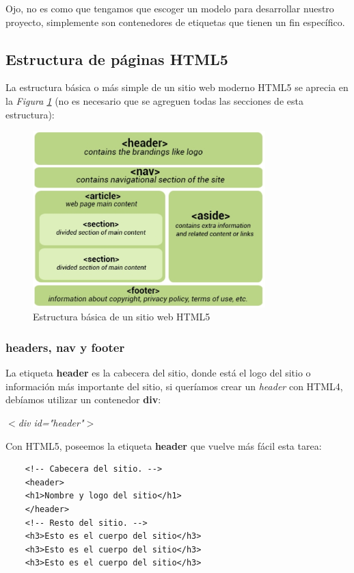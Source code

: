 Ojo, no es como que tengamos que escoger un modelo para desarrollar nuestro proyecto, simplemente son contenedores de etiquetas que tienen un fin específico.


\subsection{Estructura de páginas HTML5}
\hspace{0.55cm}La estructura básica o más simple de un sitio web moderno HTML5 se aprecia en la \textit{Figura \ref{fig: 13}} (no es necesario que se agreguen todas las secciones de esta estructura):
\begin{figure}[H]
    \centering
    \caption{Estructura básica de un sitio web HTML5}
    \label{fig: 13}
    \includegraphics[width=9cm]{ss_html/estructura basica_html5.png}
\end{figure}


\subsubsection{headers, nav y footer}
\hspace{0.55cm}La etiqueta \textbf{header} es la cabecera del sitio, donde está el logo del sitio o información más importante del sitio, si queríamos crear un \textit{header} con HTML4, debíamos utilizar un contenedor \textbf{div}:
\begin{center}
    \textit{$<$div id="header"$>$}
\end{center}

Con HTML5, poseemos la etiqueta \textbf{header} que vuelve más fácil esta tarea:
\begin{lstlisting}
    <!-- Cabecera del sitio. -->
    <header>
	<h1>Nombre y logo del sitio</h1>
    </header>
    <!-- Resto del sitio. -->
    <h3>Esto es el cuerpo del sitio</h3>
    <h3>Esto es el cuerpo del sitio</h3>
    <h3>Esto es el cuerpo del sitio</h3>
\end{lstlisting}

